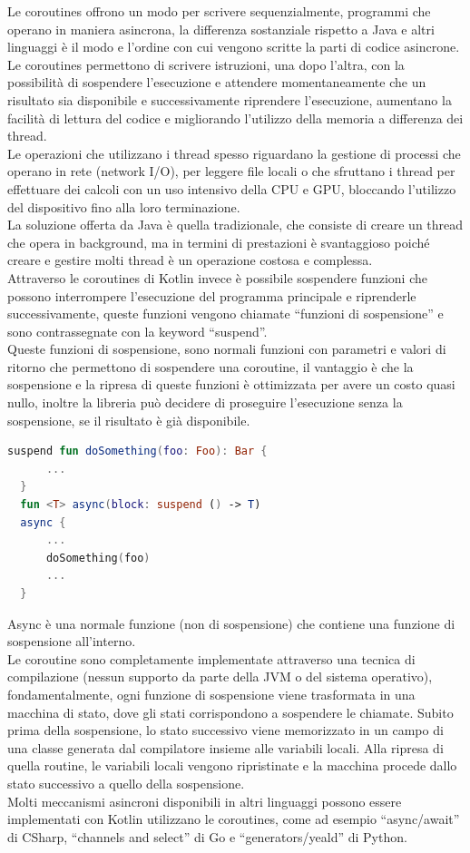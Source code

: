Le coroutines offrono un modo per scrivere sequenzialmente, programmi che operano in maniera asincrona, la differenza sostanziale rispetto a Java e altri linguaggi è il modo e l'ordine con cui vengono scritte la parti di codice asincrone. Le coroutines permettono di scrivere istruzioni, una dopo l'altra, con la possibilità di sospendere l'esecuzione e attendere momentaneamente che un risultato sia disponibile e successivamente riprendere l'esecuzione, aumentano la facilità di lettura del codice e migliorando l'utilizzo della memoria a differenza dei thread.\\
Le operazioni che utilizzano i thread spesso riguardano la gestione di processi che operano in rete (network I/O), per leggere file locali o che sfruttano i thread per  effettuare dei calcoli con un uso intensivo della CPU e GPU, bloccando l'utilizzo del dispositivo fino alla loro terminazione.\\
La soluzione offerta da Java è quella tradizionale, che consiste di creare un thread che opera in background, ma in termini di prestazioni è svantaggioso poiché creare e gestire molti thread è un operazione costosa e complessa.\\
Attraverso le coroutines di Kotlin invece è possibile sospendere funzioni che possono interrompere l'esecuzione del programma principale e riprenderle successivamente, queste funzioni vengono chiamate ``funzioni di sospensione'' e sono contrassegnate con la keyword ``suspend''.\\
Queste funzioni di sospensione, sono normali funzioni con parametri e valori di ritorno che permettono di sospendere una coroutine, il vantaggio è che la sospensione e la ripresa di queste funzioni è ottimizzata per avere un costo quasi nullo, inoltre la libreria può decidere di proseguire l'esecuzione senza la sospensione, se il risultato è già disponibile.

\begin{lstlisting}[language=kotlin,caption={Esempio Kotlin Coroutines }]
  suspend fun doSomething(foo: Foo): Bar {
      ...
  }
  fun <T> async(block: suspend () -> T)
  async {
      ...
      doSomething(foo)
      ...
  }

\end{lstlisting}

Async è una normale funzione (non di sospensione) che contiene una funzione di sospensione all'interno.\\
Le coroutine sono completamente implementate attraverso una tecnica di compilazione (nessun supporto da parte della JVM o del sistema operativo), fondamentalmente, ogni funzione di sospensione viene trasformata in una macchina di stato, dove gli stati corrispondono a sospendere le chiamate. Subito prima della sospensione, lo stato successivo viene memorizzato in un campo di una classe generata dal compilatore insieme alle variabili locali. Alla ripresa di quella routine, le variabili locali vengono ripristinate e la macchina procede dallo stato successivo a quello della sospensione.\\
Molti meccanismi asincroni disponibili in altri linguaggi possono essere implementati con Kotlin utilizzano le coroutines, come ad esempio ``async/await'' di CSharp, ``channels and select'' di Go e ``generators/yeald'' di Python.


